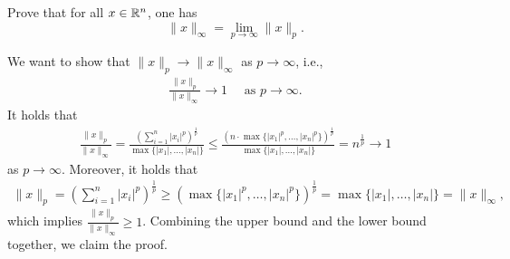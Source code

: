 \documentclass{ExerciseSheet}
\newif\ifsolutions
\begin{document}
\fi
\vskip 0.5cm




\begin{problem}
Prove that for all $x\in \mathbb{R}^n$, one has
\begin{equation*}
    \|x\|_\infty = \lim_{p\rightarrow \infty} \|x\|_p.
\end{equation*}
\end{problem}

\ifsolutions
\vskip 0.3cm
\begin{solution}
We want to show that $\lVert x\rVert_p\rightarrow\lVert x\rVert_\infty$ as $p\rightarrow\infty$, i.e., 
\begin{align*}
    \frac{\lVert x\rVert_p}{\lVert x\rVert_\infty}\rightarrow 1 \quad \text{  as }p\rightarrow\infty.
\end{align*}
It holds that 
\begin{align*}
    \frac{\lVert x\rVert_p}{\lVert x\rVert_\infty}=\frac{\left(\sum_{i=1}^n|x_i|^p\right)^\frac{1}{p}}{\max\{|x_1|,\ldots,|x_n|\}}\leq \frac{\left(n\cdot\max\{|x_1|^p,\ldots,|x_n|^p\}\right)^\frac{1}{p}}{\max\{|x_1|,\ldots,|x_n|\}}=n^{\frac{1}{p}}\rightarrow 1
\end{align*}
as $p\rightarrow \infty$. Moreover, it holds that
\begin{align*}
    \lVert x\rVert_p = \left(\sum_{i=1}^n|x_i|^p\right)^\frac{1}{p} \geq \left(\max\{|x_1|^p,\ldots,|x_n|^p\}\right)^\frac{1}{p}=\max\{|x_1|,\ldots,|x_n|\}=\lVert x\rVert_\infty,
\end{align*}
which implies $\frac{\lVert x\rVert_p}{\lVert x\rVert_\infty}\geq 1$. Combining the upper bound and the lower bound together, we claim the proof. 
\end{solution}
\end{document}
